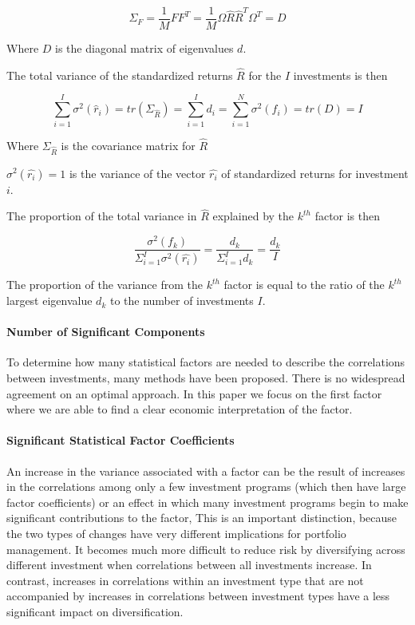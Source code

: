 \documentclass[]{article}
\begin{document}
\[\Sigma_{F}=\frac{1}{M}FF^{T}=\frac{1}{M}\Omega\hat{R}\hat{R}^{T} \Omega^{T} = D\]

Where \(D\) is the diagonal matrix of eigenvalues \(d\).

The total variance of the standardized returns \(\hat{R}\) for the \(I\)
investments is then

\[\sum_{i=1}^{I}\sigma^{2}(\hat{r}_{i})=tr(\Sigma_{\hat{R}})=\sum_{i=1}^{I}d_{i}=\sum_{i=1}^{N}\sigma^{2}(f_{i})=tr(D)=I\]

Where \(\Sigma_{\hat{R}}\) is the covariance matrix for \(\hat{R}\)

\(\sigma^{2}(\hat{r_{i}})=1\) is the variance of the vector
\(\hat{r_{i}}\) of standardized returns for investment \(i\).

The proportion of the total variance in \(\hat{R}\) explained by the
\(k^{th}\) factor is then

\[\frac{\sigma^{2}(f_{k})}{\Sigma_{i=1}^{I}\sigma^{2}(\hat{r_{i}})}=\frac{d_{k}}{\Sigma_{i=1}^{I}d_{k}}=\frac{d_{k}}{I}\]

The proportion of the variance from the \(k^{th}\) factor is equal to
the ratio of the \(k^{th}\) largest eigenvalue \(d_{k}\) to the number
of investments \(I\).

\paragraph{Number of Significant
Components}\label{number-of-significant-components}

To determine how many statistical factors are needed to describe the
correlations between investments, many methods have been proposed. There
is no widespread agreement on an optimal approach. In this paper we
focus on the first factor where we are able to find a clear economic
interpretation of the factor.

\paragraph{Significant Statistical Factor
Coefficients}\label{significant-statistical-factor-coefficients}

An increase in the variance associated with a factor can be the result
of increases in the correlations among only a few investment programs
(which then have large factor coefficients) or an effect in which many
investment programs begin to make significant contributions to the
factor, This is an important distinction, because the two types of
changes have very different implications for portfolio management. It
becomes much more difficult to reduce risk by diversifying across
different investment when correlations between all investments increase.
In contrast, increases in correlations within an investment type that
are not accompanied by increases in correlations between investment
types have a less significant impact on diversification.
\end{document}
